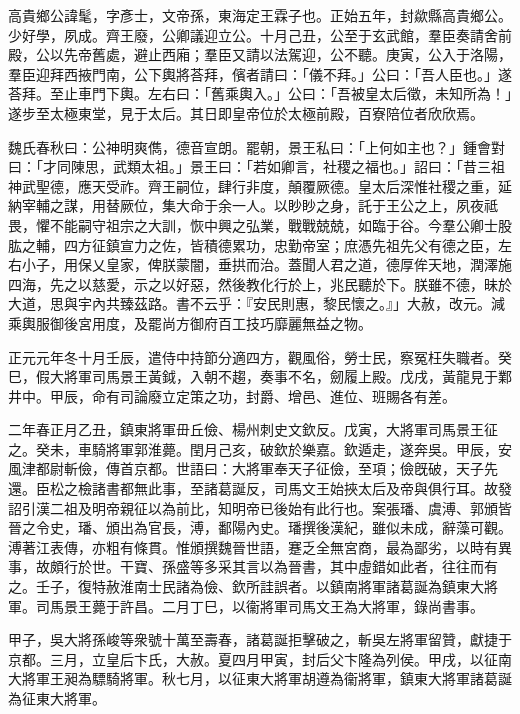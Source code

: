 
\begin{pinyinscope}
高貴鄉公諱髦，字彥士，文帝孫，東海定王霖子也。正始五年，封歘縣高貴鄉公。少好學，夙成。齊王廢，公卿議迎立公。十月己丑，公至于玄武館，羣臣奏請舍前殿，公以先帝舊處，避止西廂；羣臣又請以法駕迎，公不聽。庚寅，公入于洛陽，羣臣迎拜西掖門南，公下輿將荅拜，儐者請曰：「儀不拜。」公曰：「吾人臣也。」遂荅拜。至止車門下輿。左右曰：「舊乘輿入。」公曰：「吾被皇太后徵，未知所為！」遂步至太極東堂，見于太后。其日即皇帝位於太極前殿，百寮陪位者欣欣焉。

魏氏春秋曰：公神明爽儁，德音宣朗。罷朝，景王私曰：「上何如主也？」鍾會對曰：「才同陳思，武類太祖。」景王曰：「若如卿言，社稷之福也。」詔曰：「昔三祖神武聖德，應天受祚。齊王嗣位，肆行非度，顛覆厥德。皇太后深惟社稷之重，延納宰輔之謀，用替厥位，集大命于余一人。以眇眇之身，託于王公之上，夙夜祗畏，懼不能嗣守祖宗之大訓，恢中興之弘業，戰戰兢兢，如臨于谷。今羣公卿士股肱之輔，四方征鎮宣力之佐，皆積德累功，忠勤帝室；庶憑先祖先父有德之臣，左右小子，用保乂皇家，俾朕蒙闇，垂拱而治。蓋聞人君之道，德厚侔天地，潤澤施四海，先之以慈愛，示之以好惡，然後教化行於上，兆民聽於下。朕雖不德，昧於大道，思與宇內共臻茲路。書不云乎：『安民則惠，黎民懷之。』」大赦，改元。減乘輿服御後宮用度，及罷尚方御府百工技巧靡麗無益之物。

正元元年冬十月壬辰，遣侍中持節分適四方，觀風俗，勞士民，察冤枉失職者。癸巳，假大將軍司馬景王黃鉞，入朝不趨，奏事不名，劒履上殿。戊戌，黃龍見于鄴井中。甲辰，命有司論廢立定策之功，封爵、增邑、進位、班賜各有差。

二年春正月乙丑，鎮東將軍毌丘儉、楊州刺史文欽反。戊寅，大將軍司馬景王征之。癸未，車騎將軍郭淮薨。閏月己亥，破欽於樂嘉。欽遁走，遂奔吳。甲辰，安風津都尉斬儉，傳首京都。世語曰：大將軍奉天子征儉，至項；儉旣破，天子先還。臣松之檢諸書都無此事，至諸葛誕反，司馬文王始挾太后及帝與俱行耳。故發詔引漢二祖及明帝親征以為前比，知明帝已後始有此行也。案張璠、虞溥、郭頒皆晉之令史，璠、頒出為官長，溥，鄱陽內史。璠撰後漢紀，雖似未成，辭藻可觀。溥著江表傳，亦粗有條貫。惟頒撰魏晉世語，蹇乏全無宮商，最為鄙劣，以時有異事，故頗行於世。干寶、孫盛等多采其言以為晉書，其中虛錯如此者，往往而有之。壬子，復特赦淮南士民諸為儉、欽所詿誤者。以鎮南將軍諸葛誕為鎮東大將軍。司馬景王薨于許昌。二月丁巳，以衞將軍司馬文王為大將軍，錄尚書事。

甲子，吳大將孫峻等衆號十萬至壽春，諸葛誕拒擊破之，斬吳左將軍留贊，獻捷于京都。三月，立皇后卞氏，大赦。夏四月甲寅，封后父卞隆為列侯。甲戌，以征南大將軍王昶為驃騎將軍。秋七月，以征東大將軍胡遵為衞將軍，鎮東大將軍諸葛誕為征東大將軍。


\end{pinyinscope}
